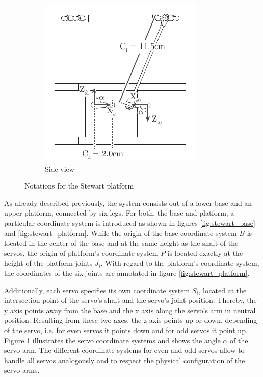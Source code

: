 \begin{figure}
	\begin{subfigure}{0.49\textwidth}
		\centering
		\includegraphics{../figures/stewart_side}
		\caption{Side view}
		\label{fig:stewart_side}
	\end{subfigure}
	\caption{Notations for the Stewart platform}
	\label{fig:stewart_notation}
\end{figure}

As already described previously, the system consists out of a lower base and
an upper platform, connected by six legs. For both, the base and platform, a
particular coordinate system is introduced as shown in figures
\ref{fig:stewart_base} and \ref{fig:stewart_platform}. While the origin of the
base coordinate system $B$ is located in the center of the base and at the
same height as the shaft of the servos, the origin of platform's coordinate
system $P$ is located exactly at the height of the platform joints
$J_i$. With regard to the platform's coordinate system, the coordinates of the
six joints are annotated in figure \ref{fig:stewart_platform}.

Additionally, each servo specifies its own coordinate system $S_i$, located at
the intersection point of the servo's shaft and the servo's joint position.
Thereby, the y axis points away from the base and the x axis along the servo's
arm in neutral position. Resulting from these two axes, the z axis points up
or down, depending of the servo, i.e. for even servos it points down and for
odd servos it point up. Figure \ref{fig:stewart_side} illustrates the servo
coordinate systems and shows the angle $\alpha$ of the servo arm. The
different coordinate systems for even and odd servos allow to handle all
servos analogously and to respect the physical configuration of the servo
arms.

